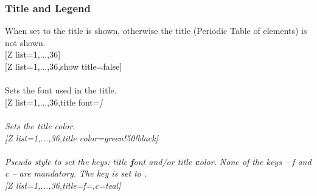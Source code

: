\vfill%
\subsubsection{\texorpdfstring{ Title and Legend}{Title and Legend}}
\label{option_show title}%
%
{When set to  the title is shown, otherwise the title (Periodic Table of elements) is not shown.}%
\\ [5pt][Z list={1,...,36}]%
\\ [10pt]\makebox[\linewidth][c]{\scalebox{.6}{\pgfPT[Z list={1,...,36}]}}%
\newpage%
[Z list={1,...,36},show title=false]%
\\ [10pt]\makebox[\linewidth][c]{\scalebox{.6}{\pgfPT[Z list={1,...,36},show title=false]}}%
\\ [0pt]\pgfPTendoption%
\label{option_title font}%
%
{Sets the font used in the title.}%
\\ [5pt][Z list={1,...,36},title font=\string\Huge\string\itshape]%
\\ [10pt]\makebox[\linewidth][c]{\scalebox{.6}{\pgfPT[Z list={1,...,36},title font=\Huge\itshape]}}%
\\ [0pt]\pgfPTendoption%
\label{option_title color}%
%
{Sets the title color.}%
\\ [5pt][Z list={1,...,36},title color=green!50!black]%
\\ [10pt]\makebox[\linewidth][c]{\scalebox{.6}{\pgfPT[Z list={1,...,36},title color=green!50!black]}}%
\\ [0pt]\pgfPTendoption%
\vfill%
\label{style_title}%
%
{\textit{Pseudo style} to set the keys: title \textbf{f}ont and/or title \textbf{c}olor. None of the \textit{keys} -- f and c -- are mandatory.
The key  is set to .
\\ [3pt]%
}%
\vfill%
\newpage%
[Z list={1,...,36},title={f=\string\Huge,c=teal}]%
\\ [10pt]\makebox[\linewidth][c]{\scalebox{.6}{\pgfPT[Z list={1,...,36},title={f=\Huge,c=teal}]}}%
